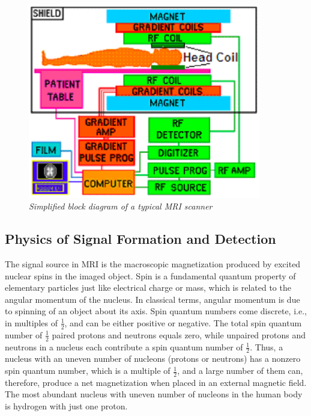 \begin{figure}[htb]
  \begin{minipage}[b]{4in}
    \centering
    \centerline{\mbox{\includegraphics[width=4in]{background/images/MRI_hardware.eps}}}
  \end{minipage}
\caption{\emph{Simplified block diagram of a typical MRI scanner}} \label{fig:scanner_block}
\end{figure}

\subsection{Physics of Signal Formation and Detection}

The signal source in MRI is the macroscopic magnetization produced by excited nuclear spins in the 
imaged object. Spin is a fundamental quantum property of elementary particles just like electrical 
charge or mass, which is related to the angular momentum of the nucleus. In classical terms, angular 
momentum is due to spinning of an object about its axis. Spin quantum numbers come discrete, i.e.,  in 
multiples of $\frac{1}{2}$, and can be either positive or negative. The total spin quantum number of 
$\frac{1}{2}$ paired protons
and neutrons equals zero, while unpaired protons and neutrons in a nucleus each contribute a spin 
quantum number of $\frac{1}{2}$. Thus, a nucleus with an uneven number of nucleons (protons or neutrons) 
has a nonzero spin quantum number, which is a multiple of $\frac{1}{2}$, 
and a large number of them can, therefore, 
produce a net magnetization when placed in an external magnetic field. The most abundant nucleus with 
uneven number of nucleons in the human body is hydrogen with just one proton.

